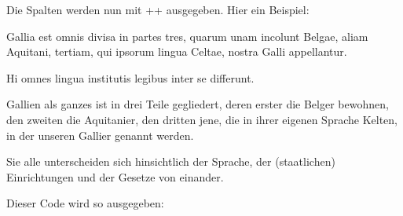 Die Spalten werden nun mit +\Columns+ ausgegeben. Hier ein Beispiel:



\begin{lfgwcode}{}
\begin{pairs}
\begin{Leftside}
\beginnumbering
\autopar
{}

Gallia est omnis divisa in partes tres, 
    quarum unam incolunt Belgae,
    aliam Aquitani,
    tertiam, qui ipsorum lingua Celtae, nostra Galli appellantur.

Hi omnes lingua institutis legibus inter se differunt.

\endnumbering
\end{Leftside}

\begin{Rightside}
\beginnumbering
\autopar

Gallien als ganzes ist in drei Teile gegliedert,
    deren erster die Belger bewohnen,
    den zweiten die Aquitanier,
    den dritten jene, die in ihrer eigenen Sprache Kelten, in der unseren Gallier genannt werden.

Sie alle unterscheiden sich hinsichtlich der Sprache, 
    der (staatlichen) Einrichtungen und der Gesetze von einander.
    
\endnumbering
\end{Rightside}
\end{pairs}

\Columns
\end{lfgwcode}

Dieser Code wird so ausgegeben:

\setlength{\Lcolwidth}{0.425\textwidth}
\setlength{\Rcolwidth}{0.425\textwidth}

